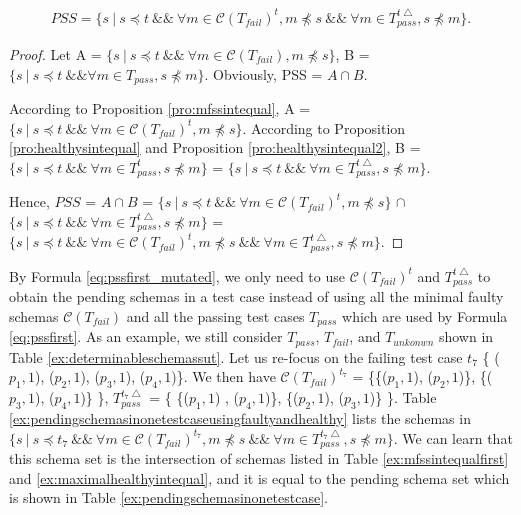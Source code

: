 \begin{equation}
\begin{aligned}\label{eq:pssfirst_mutated}
PSS=\{ s\ |\ s \preceq t\ \&\&\ \forall m \in \mathcal{C}(T_{fail})^{t},  m \npreceq s  \ \&\&\  \forall m \in T_{pass}^{t\bigtriangleup}, s \npreceq m \} .
\end{aligned}
\end{equation}

\begin{proof}

Let A = $\{ s\ |\  s \preceq t\ \&\&\ \forall m \in \mathcal{C}(T_{fail}),  m \npreceq s \}$, B = $ \{ s\ |\ s \preceq t\ \&\&  \forall m \in T_{pass}, s \npreceq m \} $. Obviously, PSS = $A \cap B$.

According to Proposition \ref{pro:mfssintequal}, A = $\{ s\ |\  s \preceq t\ \&\&\ \forall m \in \mathcal{C}(T_{fail})^{t},  m \npreceq s \}$.
According to Proposition \ref{pro:healthysintequal} and Proposition \ref{pro:healthysintequal2}, B = $\{ s\ |\  s \preceq t\ \&\&\ \forall m \in T_{pass}^{t},  s \npreceq m \}$ = $\{ s\ |\  s \preceq t\ \&\&\ \forall m \in T_{pass}^{t\bigtriangleup},  s \npreceq m \}$.

Hence, $PSS$ = $A \cap B$ = $\{ s\ |\  s \preceq t\ \&\&\ \forall m \in \mathcal{C}(T_{fail})^{t},  m \npreceq s \}$ $\cap$ $\{ s\ |\  s \preceq t\ \&\&\ \forall m \in T_{pass}^{t\bigtriangleup},  s \npreceq m \}$ = $\{ s\ |\ s \preceq t\ \&\&\ \forall m \in \mathcal{C}(T_{fail})^{t},  m \npreceq s  \ \&\&\  \forall m \in T_{pass}^{t\bigtriangleup}, s \npreceq m \}$.
\end{proof}

By Formula \ref{eq:pssfirst_mutated}, we only need to use $\mathcal{C}(T_{fail})^{t}$ and $T_{pass}^{t\bigtriangleup}$ to obtain the pending schemas in a test case instead of using all the minimal faulty schemas $\mathcal{C}(T_{fail})$ and all the passing test cases $ T_{pass}$ which are used by Formula \ref{eq:pssfirst}. As an example, we still consider  $T_{pass}$, $T_{fail}$, and $T_{unkonwn}$ shown in Table \ref{ex:determinableschemassut}. Let us re-focus on the failing test case $t_{7}$ \{ ($p_{1}, 1$), ($p_{2}, 1$), ($p_{3}, 1$), ($p_{4}, 1$)\}. We then have  $\mathcal{C}(T_{fail})^{t_{7}}$ = \{\{($p_{1}, 1$), ($p_{2}, 1$)\}, \{($p_{3}, 1$), ($p_{4}, 1$)\} \}, $T_{pass}^{t_{7}\bigtriangleup}$ = \{ \{($p_{1}, 1$) , ($p_{4}, 1$)\}, \{($p_{2}, 1$), ($p_{3}, 1$)\} \}.  Table \ref{ex:pendingschemasinonetestcaseusingfaultyandhealthy} lists the schemas in $\{ s\ |\ s \preceq t_{7}\ \&\&\ \forall m \in \mathcal{C}(T_{fail})^{t_{7}},  m \npreceq s  \ \&\&\  \forall m \in T_{pass}^{t_{7}\bigtriangleup}, s \npreceq m \} $. We can learn that this schema set is the intersection of schemas listed in Table \ref{ex:mfssintequalfirst} and \ref{ex:maximalhealthyintequal}, and it is equal to the pending schema set which is shown in Table \ref{ex:pendingschemasinonetestcase}.

